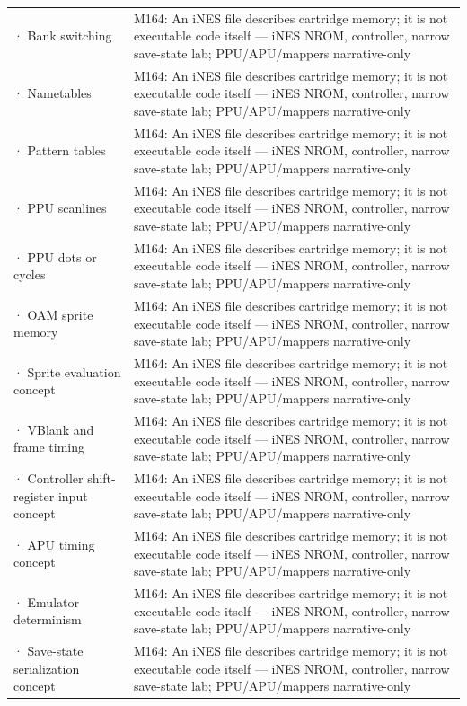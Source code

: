 {\begin{longtable}[]{@{}
  >{\raggedright\arraybackslash}p{}
  >{\raggedright\arraybackslash}p{}@{}}
2733 · Bank switching & M164: An iNES file describes cartridge memory; it is not executable code itself --- iNES NROM, controller, narrow save-state lab; PPU/APU/mappers narrative-only \\
2734 · Nametables & M164: An iNES file describes cartridge memory; it is not executable code itself --- iNES NROM, controller, narrow save-state lab; PPU/APU/mappers narrative-only \\
2735 · Pattern tables & M164: An iNES file describes cartridge memory; it is not executable code itself --- iNES NROM, controller, narrow save-state lab; PPU/APU/mappers narrative-only \\
2736 · PPU scanlines & M164: An iNES file describes cartridge memory; it is not executable code itself --- iNES NROM, controller, narrow save-state lab; PPU/APU/mappers narrative-only \\
2737 · PPU dots or cycles & M164: An iNES file describes cartridge memory; it is not executable code itself --- iNES NROM, controller, narrow save-state lab; PPU/APU/mappers narrative-only \\
2738 · OAM sprite memory & M164: An iNES file describes cartridge memory; it is not executable code itself --- iNES NROM, controller, narrow save-state lab; PPU/APU/mappers narrative-only \\
2739 · Sprite evaluation concept & M164: An iNES file describes cartridge memory; it is not executable code itself --- iNES NROM, controller, narrow save-state lab; PPU/APU/mappers narrative-only \\
2740 · VBlank and frame timing & M164: An iNES file describes cartridge memory; it is not executable code itself --- iNES NROM, controller, narrow save-state lab; PPU/APU/mappers narrative-only \\
2741 · Controller shift-register input concept & M164: An iNES file describes cartridge memory; it is not executable code itself --- iNES NROM, controller, narrow save-state lab; PPU/APU/mappers narrative-only \\
2742 · APU timing concept & M164: An iNES file describes cartridge memory; it is not executable code itself --- iNES NROM, controller, narrow save-state lab; PPU/APU/mappers narrative-only \\
2743 · Emulator determinism & M164: An iNES file describes cartridge memory; it is not executable code itself --- iNES NROM, controller, narrow save-state lab; PPU/APU/mappers narrative-only \\
2744 · Save-state serialization concept & M164: An iNES file describes cartridge memory; it is not executable code itself --- iNES NROM, controller, narrow save-state lab; PPU/APU/mappers narrative-only \\

\end{longtable}}
